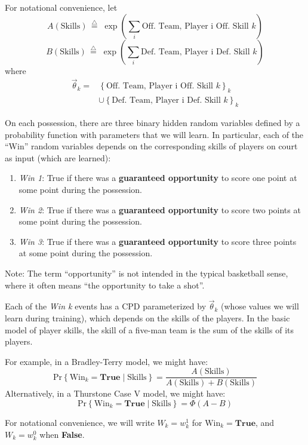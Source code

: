 \documentclass[10pt,twocolumn]{article}
\newcommand{\prb}[1]{\ensuremath{  \mathrm{Pr}\left\{ #1 \right\}  }}
\newcommand{\tridefeq}{\ensuremath{  \,{\overset{\triangle}{=}}\;   }}
\begin{document}
For notational convenience, let
\[
A\left(\mathrm{Skills}\right) \tridefeq \exp \left( \sum_i \textrm{Off. Team, Player i Off. Skill } k \right)
\]%
\[
B\left(\mathrm{Skills}\right) \tridefeq  \exp \left( \sum_i \textrm{Def. Team, Player i Def. Skill } k \right)
\]%
where
\begin{align*}
\vec \theta_k =& \left\{\textrm{Off. Team, Player i Off. Skill } k\right\}_k
\\             &\cup \left\{\textrm{Def. Team, Player i Def. Skill } k\right\}_k
\end{align*}%

On each possession, there are three binary hidden random variables defined by a probability function with parameters that we will learn. In particular, each of the ``Win'' random variables depends on the corresponding skills of players on court as input (which are learned):
\begin{enumerate}
\item \emph{Win 1}: True if there was a {\bf guaranteed opportunity} to score one point at some point during the possession.
\item \emph{Win 2}: True if there was a {\bf guaranteed opportunity} to score two points at some point during the possession.
\item \emph{Win 3}: True if there was a {\bf guaranteed opportunity} to score three points at some point during the possession.
\end{enumerate}
Note: The term ``opportunity'' is not intended in the typical basketball sense, where it often means ``the opportunity to take a shot''.


Each of the \emph{Win k} events has a CPD parameterized by $\vec \theta_k$ (whose values we will learn during training), which depends on the skills of the players.
In the basic model of player skills, the skill of a five-man team is the sum of the skills of its players.

For example, in a Bradley-Terry model, we might have:
\[
\prb{\mathrm{Win}_k = \mathbf{True} \mid \mathrm{Skills} } = \frac{ A\left(\mathrm{Skills}\right) } { A\left(\mathrm{Skills}\right) + B\left(\mathrm{Skills}\right) }
\]%
Alternatively, in a Thurstone Case V model, we might have:
\[
\prb{\mathrm{Win}_k = \mathbf{True} \mid \mathrm{Skills} } = \Phi\left( A - B \right)
\]%

For notational convenience, we will write $W_k = w_k^1$ for $\mathrm{Win}_k = \mathbf{True}$, and $W_k = w_k^0$ when {\bf False}.
\end{document}

